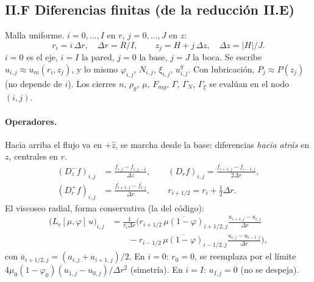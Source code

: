 \documentclass[11pt,a4paper]{article}
\begin{document}
\subsection*{II.F Diferencias finitas (de la reducción II.E)}

Malla uniforme. $i=0,\ldots,I$ en $r$, $j=0,\ldots,J$ en $z$:
\begin{equation}
\label{eq:malla}
r_i=i\,\Delta r,\quad
\Delta r=R/I,
\qquad
z_j=H+j\,\Delta z,\quad
\Delta z=|H|/J.
\end{equation}
$i=0$ es el eje, $i=I$ la pared, $j=0$ la base, $j=J$ la boca.
Se escribe $u_{i,j}\approx u_m(r_i,z_j)$, y lo mismo
$\varphi_{i,j}$, $N_{i,j}$, $\xi_{i,j}$, $u^g_{i,j}$.
Con lubricación, $P_j\approx P(z_j)$ (no depende de $i$).
Los cierres $n$, $\rho_g$, $\mu$, $F_{mg}$, $\Gamma$,
$\Gamma_N$, $\Gamma_\xi$ se evalúan en el nodo $(i,j)$.

\paragraph{Operadores.}
Hacia arriba el flujo va en $+\hat z$, se marcha desde la
base: diferencias \emph{hacia atrás} en $z$, centrales en $r$.
\begin{align}
\label{eq:ops}
(D_z^- f)_{i,j}
&=\frac{f_{i,j}-f_{i,j-1}}{\Delta z},
\qquad
(D_r f)_{i,j}
=\frac{f_{i+1,j}-f_{i-1,j}}{2\Delta r},
\\
(D_r^+ f)_{i,j}
&=\frac{f_{i+1,j}-f_{i,j}}{\Delta r},
\qquad
r_{i+1/2}
=r_i+\tfrac12\Delta r.
\end{align}
El viscoseo radial, forma conservativa (la del código):
\begin{equation}
\label{eq:Lr}
\begin{aligned}
\bigl(L_r[\mu,\varphi]\,u\bigr)_{i,j}
&=\frac{1}{r_i\Delta r}\Biggl(
r_{i+1/2}\,
\overline{\mu(1-\varphi)}_{i+1/2,j}
\frac{u_{i+1,j}-u_{i,j}}{\Delta r}
\\
&\qquad
-r_{i-1/2}\,
\overline{\mu(1-\varphi)}_{i-1/2,j}
\frac{u_{i,j}-u_{i-1,j}}{\Delta r}
\Biggr),
\end{aligned}
\end{equation}
con $\overline{a}_{i+1/2,j}=(a_{i,j}+a_{i+1,j})/2$.
En $i=0$: $r_0=0$, se reemplaza por el límite
$4\mu_0(1-\varphi_0)(u_{1,j}-u_{0,j})/\Delta r^2$
(simetría). En $i=I$: $u_{I,j}=0$ (no se despeja).
\end{document}
